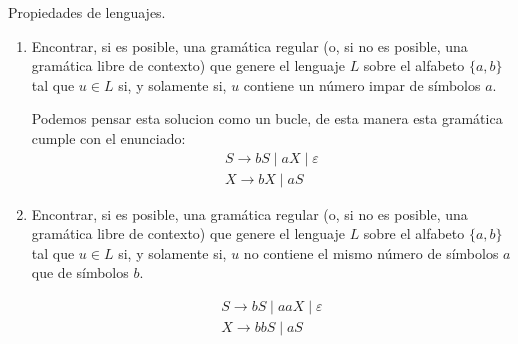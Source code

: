 \documentclass[12pt]{report} %
\begin{document}
\begin{ejercicio}
Propiedades de lenguajes.

\begin{enumerate}[label=\alph*)]
    \item Encontrar, si es posible, una gramática regular (o, si no es posible, una gramática libre de contexto) que genere el lenguaje $L$ sobre el alfabeto $\{a, b\}$ tal que $u \in L$ si, y solamente si, $u$ contiene un número impar de símbolos $a$.

    \begin{solucion}[a)]
    Podemos pensar esta solucion como un bucle, de esta manera esta gramática cumple con el enunciado:
    \begin{align*}
        S \rightarrow bS \mid aX \mid \varepsilon \\
        X \rightarrow bX \mid aS 
    \end{align*}
    \end{solucion}

    \item Encontrar, si es posible, una gramática regular (o, si no es posible, una gramática libre de contexto) que genere el lenguaje $L$ sobre el alfabeto $\{a, b\}$ tal que $u \in L$ si, y solamente si, $u$ no contiene el mismo número de símbolos $a$ que de símbolos $b$.

    \begin{solucion}[b)]
    \begin{align*}
        S \rightarrow bS \mid aaX \mid \varepsilon \\
        X \rightarrow bbS \mid aS  
    \end{align*}
    \end{solucion}


\end{enumerate}

\end{ejercicio}
\end{document}
